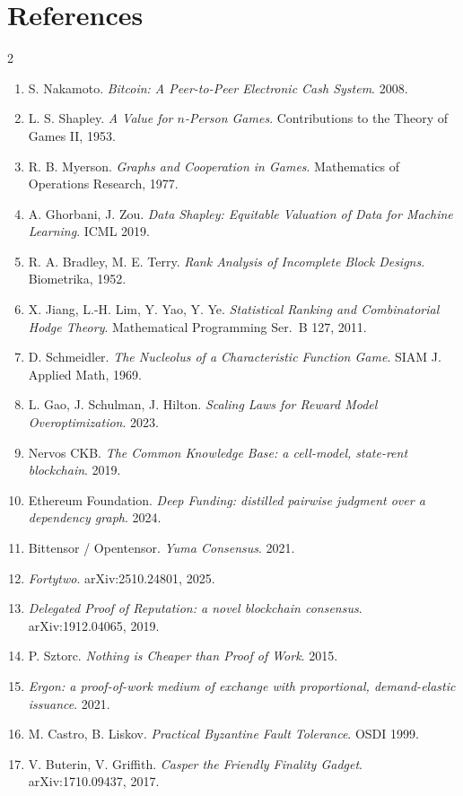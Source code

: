 \documentclass[10pt]{article}
\begin{document}
\section*{References}
\footnotesize
\begin{multicols}{2}
\begin{enumerate}[leftmargin=1.4em,itemsep=0pt]
\item S. Nakamoto. \emph{Bitcoin: A Peer-to-Peer Electronic Cash System}. 2008.
\item L. S. Shapley. \emph{A Value for $n$-Person Games}. Contributions to the Theory of Games II, 1953.
\item R. B. Myerson. \emph{Graphs and Cooperation in Games}. Mathematics of Operations Research, 1977.
\item A. Ghorbani, J. Zou. \emph{Data Shapley: Equitable Valuation of Data for Machine Learning}. ICML 2019.
\item R. A. Bradley, M. E. Terry. \emph{Rank Analysis of Incomplete Block Designs}. Biometrika, 1952.
\item X. Jiang, L.-H. Lim, Y. Yao, Y. Ye. \emph{Statistical Ranking and Combinatorial Hodge Theory}. Mathematical Programming Ser.~B 127, 2011.
\item D. Schmeidler. \emph{The Nucleolus of a Characteristic Function Game}. SIAM J. Applied Math, 1969.
\item L. Gao, J. Schulman, J. Hilton. \emph{Scaling Laws for Reward Model Overoptimization}. 2023.
\item Nervos CKB. \emph{The Common Knowledge Base: a cell-model, state-rent blockchain}. 2019.
\item Ethereum Foundation. \emph{Deep Funding: distilled pairwise judgment over a dependency graph}. 2024.
\item Bittensor / Opentensor. \emph{Yuma Consensus}. 2021.
\item \emph{Fortytwo}. arXiv:2510.24801, 2025.
\item \emph{Delegated Proof of Reputation: a novel blockchain consensus}. arXiv:1912.04065, 2019.
\item P. Sztorc. \emph{Nothing is Cheaper than Proof of Work}. 2015.
\item \emph{Ergon: a proof-of-work medium of exchange with proportional, demand-elastic issuance}. 2021.
\item M. Castro, B. Liskov. \emph{Practical Byzantine Fault Tolerance}. OSDI 1999.
\item V. Buterin, V. Griffith. \emph{Casper the Friendly Finality Gadget}. arXiv:1710.09437, 2017.

\end{enumerate}
\end{multicols}
\end{document}
